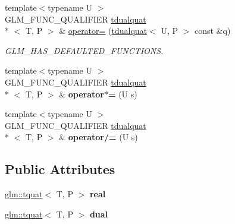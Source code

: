 \begin{DoxyCompactItemize}
\item 
\hypertarget{structglm_1_1tdualquat_a4c6247ec39b3e82e5224988ec4312c77}{{\footnotesize template$<$typename U $>$ }\\G\-L\-M\-\_\-\-F\-U\-N\-C\-\_\-\-Q\-U\-A\-L\-I\-F\-I\-E\-R \hyperlink{structglm_1_1tdualquat}{tdualquat}\\*
$<$ T, P $>$ \& \hyperlink{structglm_1_1tdualquat_a4c6247ec39b3e82e5224988ec4312c77}{operator=} (\hyperlink{structglm_1_1tdualquat}{tdualquat}$<$ U, P $>$ const \&q)}\label{structglm_1_1tdualquat_a4c6247ec39b3e82e5224988ec4312c77}

\begin{DoxyCompactList}\small\item\em G\-L\-M\-\_\-\-H\-A\-S\-\_\-\-D\-E\-F\-A\-U\-L\-T\-E\-D\-\_\-\-F\-U\-N\-C\-T\-I\-O\-N\-S. \end{DoxyCompactList}\item 
\hypertarget{structglm_1_1tdualquat_a0364e641b3b352f8c3eaa98fc952c737}{{\footnotesize template$<$typename U $>$ }\\G\-L\-M\-\_\-\-F\-U\-N\-C\-\_\-\-Q\-U\-A\-L\-I\-F\-I\-E\-R \hyperlink{structglm_1_1tdualquat}{tdualquat}\\*
$<$ T, P $>$ \& {\bfseries operator$\ast$=} (U s)}\label{structglm_1_1tdualquat_a0364e641b3b352f8c3eaa98fc952c737}

\item 
\hypertarget{structglm_1_1tdualquat_a1843b865427cf6d2e474959376a1c412}{{\footnotesize template$<$typename U $>$ }\\G\-L\-M\-\_\-\-F\-U\-N\-C\-\_\-\-Q\-U\-A\-L\-I\-F\-I\-E\-R \hyperlink{structglm_1_1tdualquat}{tdualquat}\\*
$<$ T, P $>$ \& {\bfseries operator/=} (U s)}\label{structglm_1_1tdualquat_a1843b865427cf6d2e474959376a1c412}

\end{DoxyCompactItemize}
\subsection*{Public Attributes}
\begin{DoxyCompactItemize}
\item 
\hypertarget{structglm_1_1tdualquat_a402b3ac8410bd71a27f811dced8db14e}{\hyperlink{structglm_1_1tquat}{glm\-::tquat}$<$ T, P $>$ {\bfseries real}}\label{structglm_1_1tdualquat_a402b3ac8410bd71a27f811dced8db14e}

\item 
\hypertarget{structglm_1_1tdualquat_abeea1eb15f230d3bc50740c3811e1fd3}{\hyperlink{structglm_1_1tquat}{glm\-::tquat}$<$ T, P $>$ {\bfseries dual}}\label{structglm_1_1tdualquat_abeea1eb15f230d3bc50740c3811e1fd3}

\end{DoxyCompactItemize}



